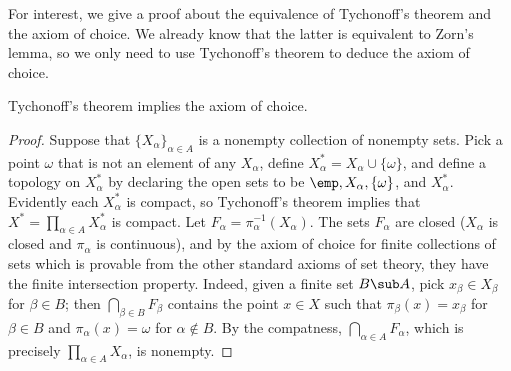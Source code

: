 For interest, we give a proof about the equivalence of Tychonoff's theorem and the axiom of choice. We already know that the latter is equivalent to Zorn's lemma, so we only need to use Tychonoff's theorem to deduce the axiom of choice.
\begin{proposition}
Tychonoff's theorem implies the axiom of choice.
\end{proposition}
\begin{proof}
Suppose that $\{X_\alpha\}_{\alpha\in A}$ is a nonempty collection of nonempty sets. Pick a point $\omega$ that is not an element of any $X_\alpha$, define $X_\alpha^*=X_\alpha\cup\{\omega\}$, and define a topology on $X^*_\alpha$ by declaring the open sets to be $\emp,X_\alpha,\{\omega\}$, and $X_\alpha^*$. Evidently each $X_\alpha^*$ is compact, so Tychonoff's theorem implies that $X^*=\prod_{\alpha\in A}X^*_\alpha$ is compact. Let $F_\alpha=\pi_\alpha^{-1}(X_\alpha)$. The sets $F_\alpha$ are closed ($X_\alpha$ is closed and $\pi_\alpha$ is continuous), and by the axiom of choice for finite collections of sets which is provable from the other standard axioms of set theory, they have the finite intersection property. Indeed, given a finite set $B\sub A$, pick $x_\beta\in X_\beta$ for $\beta\in B$; then $\bigcap_{\beta\in B}F_\beta$ contains the point $x\in X$ such that $\pi_\beta(x)=x_\beta$ for $\beta\in B$ and $\pi_\alpha(x)=\omega$ for $\alpha\notin B$. By the compatness, $\bigcap_{\alpha\in A}F_\alpha$, which is precisely $\prod_{\alpha\in A}X_\alpha$, is nonempty.
\end{proof}
